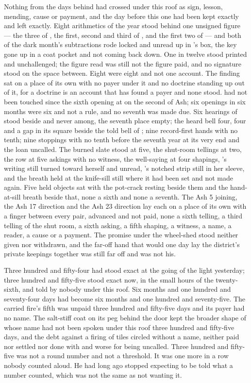 Nothing from the days behind had crossed under this roof as sign, lesson, mending, cause or payment, and the day before this one had been kept exactly and left exactly. Eight arithmetics of the year stood behind one unsigned figure --- the three of , the first, second and third of , and the first two of  --- and both of the dark month's subtractions rode locked and unread up  in 's box, the key gone up in a coat pocket and not coming back down. One in twelve stood printed and unchallenged; the figure read was still not the figure paid, and no signature stood on the space between. Eight were eight and not one account. The finding sat on a place of its own with no payer under it and no doctrine standing up out of it, for a doctrine is an account that has found a payer and none stood.  had not been touched since the sixth opening at  on the second of Ash; six openings in six months were six and not a rule, and no seventh was made due. Six hearings of  stood beside and never among, the seventh place empty; the heard bell four, four and a gap in its square beside the told bell of ; nine record-first hands with no tenth; nine stoppings with no tenth before the seventh year at its very end and the loan uncalled. The burned slate stood at five, the shut-room tellings at two, the row at five askings with no witness, the well-saying at four shapings, 's writing still turned toward herself and unread, 's notched strip still in her sleeve, and the breath held at the knife-sill still where it had been set and not made again. Five held objects sat with the pot-crack resting beside them and the hand-at-sill breath beside that, none a sixth and none a seventh. The Ash 5 joining, the Ash 17 direction and the Ash 23 direction lay each on a place of its own with a finger between every pair, advanced and not paid, none a sixth telling, a third telling of the shut room, a sixth asking, a fifth shaping, a witness, a name, a reader, a cause or a payment. The promise under the wheel-shed stood neither given nor withdrawn, and the far-off hand that would one day lay the district's private keepings together was still far off and was not his.

Three hundred and fifty-four had stood exact at the going of the light yesterday; three hundred and fifty-five stood exact now, in the small hours of the twenty-sixth, and told by nobody under this roof. Six months and one hundred and seventy-four days had become six months and one hundred and seventy-five. The carried fire's fifth was unpaid three hundred and fifty-five days and its payer had no name. The salt-stiff coat on its peg behind the door kept the broader shape of  whose name had not been spoken under this roof three hundred and fifty-five days, and the debt against a firing of tiles circled without a name, neither paid nor settled nor done with and worse for being uncalled. Three hundred and fifty-five was not a round number and not a threshold. It was one more in a row nobody counted aloud. He had long ago stopped expecting to be told what a number counted, which was not the same as not wanting it.

